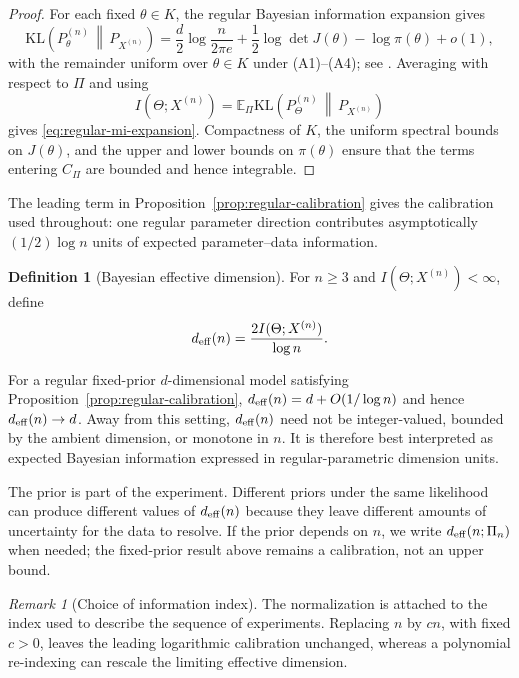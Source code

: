 \documentclass[11pt]{article}
\theoremstyle{plain}
\theoremstyle{definition}
\newtheorem{definition}{Definition}
\theoremstyle{remark}
\newtheorem{remark}{Remark}
\newcommand{\E}{\mathbb{E}}
\newcommand{\KL}{\mathrm{KL}}
\begin{document}
\begin{proof}
	For each fixed $\theta\in K$, the regular Bayesian information expansion gives
	\[
	\KL\!\left(P_\theta^{(n)}\,\middle\|\,P_{X^{(n)}}\right)
	=
	\frac d2\log\frac{n}{2\pi e}
	+
	\frac12\log\det J(\theta)
	-
	\log\pi(\theta)
	+
	o(1),
	\]
	with the remainder uniform over $\theta\in K$ under (A1)--(A4); see \citet{clarke1990information}. Averaging with respect to $\Pi$ and using
	\[
	I(\Theta;X^{(n)})
	=
	\E_\Pi
	\KL\!\left(P_\Theta^{(n)}\,\middle\|\,P_{X^{(n)}}\right)
	\]
	gives \eqref{eq:regular-mi-expansion}. Compactness of $K$, the uniform spectral bounds on $J(\theta)$, and the upper and lower bounds on $\pi(\theta)$ ensure that the terms entering $C_\Pi$ are bounded and hence integrable.
\end{proof}

The leading term in Proposition~\ref{prop:regular-calibration} gives the calibration used throughout: one regular parameter direction contributes asymptotically $(1/2)\log n$ units of expected parameter--data information.

\begin{definition}[Bayesian effective dimension]
	\label{def:effdim}
	For $n\geq3$ and $I(\Theta;X^{(n)})<\infty$, define
	\begin{equation}
		\label{eq:effdim-definition}
		d_{\rm eff}(n)=\frac{2I(\Theta;X^{(n)})}{\log n}.
	\end{equation}
\end{definition}

For a regular fixed-prior $d$-dimensional model satisfying Proposition~\ref{prop:regular-calibration}, $d_{\rm eff}(n)=d+O(1/\log n)$ and hence $d_{\rm eff}(n)\to d$. Away from this setting, $d_{\rm eff}(n)$ need not be integer-valued, bounded by the ambient dimension, or monotone in $n$. It is therefore best interpreted as expected Bayesian information expressed in regular-parametric dimension units.

The prior is part of the experiment. Different priors under the same likelihood can produce different values of $d_{\rm eff}(n)$ because they leave different amounts of uncertainty for the data to resolve. If the prior depends on $n$, we write $d_{\rm eff}(n;\Pi_n)$ when needed; the fixed-prior result above remains a calibration, not an upper bound.

\begin{remark}[Choice of information index]
	\label{rem:information-index}
	The normalization is attached to the index used to describe the sequence of experiments. Replacing $n$ by $cn$, with fixed $c>0$, leaves the leading logarithmic calibration unchanged, whereas a polynomial re-indexing can rescale the limiting effective dimension. 
	\end{remark}
\end{document}
